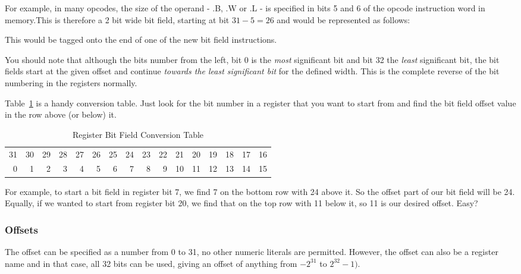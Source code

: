 
For example, in many opcodes, the size of the operand - .B, .W or .L - is specified in bits 5 and 6 of the opcode instruction word in memory.This is therefore a 2 bit wide bit field, starting at bit $31-5=26$ and would be represented as follows:


This would be tagged onto the end of one of the new bit field instructions. 

You should note that although the bits number from the left, bit 0 is the \emph{most} significant bit and bit 32 the \emph{least} significant bit, the bit fields start at the given offset and continue \emph{towards the least significant bit} for the defined width. This is the complete reverse of the bit numbering in the registers normally.

Table~\ref{tab-RBFCT} is a handy conversion table. Just look for the bit number in a register that you want to start from and find the bit field offset value in the row above (or below) it.

\begin{table}[h]
   \centering
   \begin{tabular}{r|r|r|r|r|r|r|r|r|r|r|r|r|r|r|r}
   31 & 30 & 29 & 28 & 27 & 26 & 25 & 24 & 23 & 22 & 21 & 20 & 19 & 18 & 17 & 16 \\
    0 &  1 &  2 &  3 &  4 &  5 &  6 &  7 &  8 &  9 & 10 & 11 & 12 & 13 & 14 & 15 \\
	\end{tabular}
   \caption{Register Bit Field Conversion Table}
   \label{tab-RBFCT}
\end{table}

For example, to start a bit field in register bit 7, we find 7 on the bottom row with 24 above it. So the offset part of our bit field will be 24. Equally, if we wanted to start from register bit 20, we find that on the top row with 11 below it, so 11 is our desired offset. Easy?

\subsubsection{Offsets}

The offset can be specified as a number from 0 to 31, no other numeric literals are permitted. However, the offset can also be a register name and in that case, all 32 bits can be used, giving an offset of anything from $-2^{31}$ to $2^{32}-1)$. 

